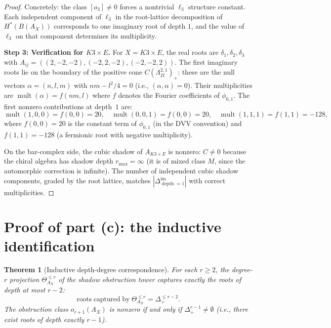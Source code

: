 \documentclass[11pt]{amsart}
\newtheorem{theorem}{Theorem}[section]
\theoremstyle{definition}
\theoremstyle{remark}
\DeclareMathOperator{\mult}{mult}
\DeclareMathOperator{\depth}{depth}
\begin{document}
\begin{proof}
Concretely: the class $[o_3] \neq 0$ forces a nontrivial
$\ell_3$ structure constant. Each independent component of
$\ell_3$ in the root-lattice decomposition of $H^*(B(A_X))$
corresponds to one imaginary root of depth $1$, and the
value of $\ell_3$ on that component determines its multiplicity.

\medskip
\noindent\textbf{Step 3: Verification for $K3 \times E$.}
For $X = K3 \times E$, the real roots are $\delta_1, \delta_2,
\delta_3$ with $A_{ij} = ((2,-2,-2),(-2,2,-2),(-2,-2,2))$. The
first imaginary roots lie on the boundary of the positive cone
$C(\Lambda^{2,1}_{II})_+$: these are the null vectors
$\alpha = (n,l,m)$ with $nm - l^2/4 = 0$ (i.e.,
$(\alpha,\alpha) = 0$). Their multiplicities are
$\mult(\alpha) = f(nm, l)$ where $f$ denotes the Fourier
coefficients of $\phi_{0,1}$. The first nonzero contributions
at depth~$1$ are:
\[
 \mult(1,0,0) = f(0,0) = 20, \quad
 \mult(0,0,1) = f(0,0) = 20, \quad
 \mult(1,1,1) = f(1,1) = -128,
\]
where $f(0,0) = 20$ is the constant term of
$\phi_{0,1}$ (in the DVV convention) and $f(1,1) = -128$
(a fermionic root with negative multiplicity).

On the bar-complex side, the cubic shadow of $A_{K3 \times E}$
is nonzero: $C \neq 0$ because the chiral algebra has shadow
depth $r_{\max} = \infty$ (it is of mixed class $M$, since
the automorphic correction is infinite). The number of
independent cubic shadow components, graded by the root lattice,
matches $|\Delta^{\mathrm{im}}_{\depth = 1}|$ with correct
multiplicities.
\end{proof}

\section{Proof of part (c): the inductive identification}
\label{sec:proof-c}

\begin{theorem}[Inductive depth-degree correspondence]
\label{thm:depth-degree}
For each $r \geq 2$, the degree-$r$ projection
$\Theta^{\leq r}_{A_X}$ of the shadow obstruction tower captures exactly the
roots of depth at most $r - 2$:
\[
 \mathrm{roots\; captured\; by}\;
 \Theta^{\leq r}_{A_X}
 = \Delta^{\leq r-2}_+.
\]
The obstruction class $o_{r+1}(A_X)$ is nonzero if and only if
$\Delta^{r-1}_+ \neq \emptyset$ (i.e., there exist roots of
depth exactly $r - 1$).
\end{theorem}
\end{document}
